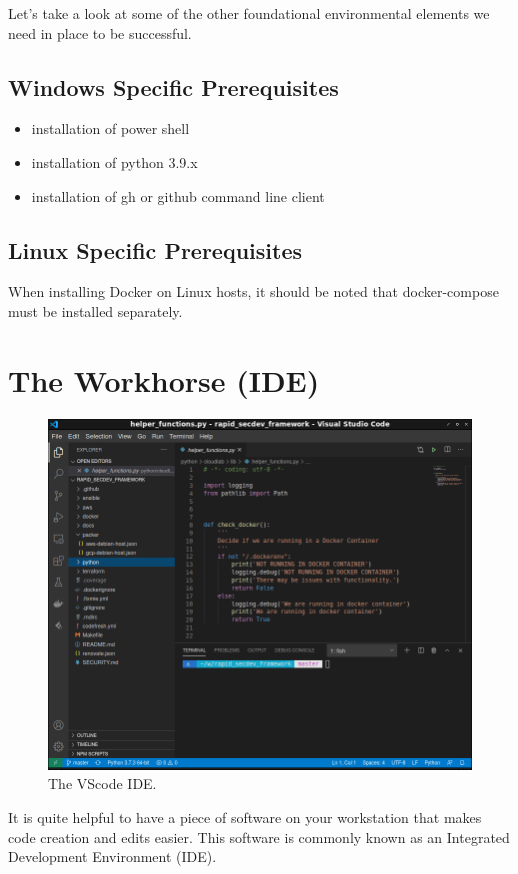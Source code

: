 \justify
Let's take a look at some of the other foundational environmental
elements we need in place to be successful.

\subsection{Windows Specific Prerequisites}

\begin{itemize}
\item installation of power shell
\item installation of python 3.9.x
\item installation of gh or github command line client
\end{itemize}

\subsection{Linux Specific Prerequisites}
\justify
When installing Docker on Linux hosts, it should be noted that docker-compose must be installed separately.

\section{The Workhorse (IDE)}
\begin{figure}
	\centering
	\includegraphics[scale=0.45]{../images/setup-vscode.png}
	\caption{The VScode IDE.}
\end{figure}
\justify
It is quite helpful to have a piece of software on your workstation that
makes code creation and edits easier. This software is commonly known as
an Integrated Development Environment (IDE).

